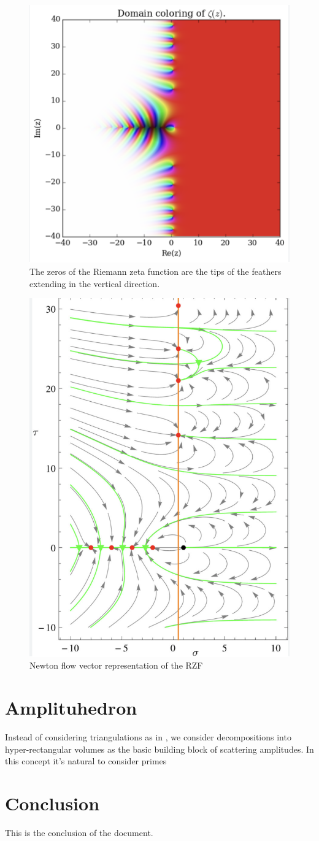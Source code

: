 \documentclass[aps,prb,twocolumn,superscriptaddress]{revtex4}
\begin{document}
\begin{figure}[h]
  \centering
    \includegraphics[width=0.5\columnwidth]
  {RZF.png}
    \caption{The zeros of the Riemann zeta function are the tips of the feathers extending in the vertical direction.}
\end{figure}

\begin{figure}[h]
  \centering
    \includegraphics[width=0.5\columnwidth]
  {vector_flow.png}
    \caption{Newton flow vector representation of the RZF}
\end{figure}


\section{Amplituhedron}
   Instead of considering triangulations as in \cite{ArakaniHamed_2014}, we consider decompositions into hyper-rectangular volumes as the basic building block of scattering amplitudes. In this concept  it's natural to consider primes   


\section{Conclusion}

This is the conclusion of the document.
\end{document}
